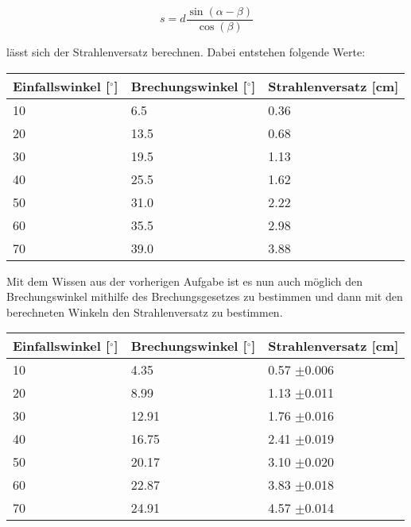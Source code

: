 \begin{displaymath}
    s = d\frac{\sin(\alpha-\beta)}{\cos(\beta)}
\end{displaymath}

\noindent lässt sich der Strahlenversatz berechnen. Dabei entstehen folgende Werte:

\begin{minipage}{\linewidth}
    \begin{table}[H]
        \centering
    \begin{tabular}{lll}
        \toprule
        Einfallswinkel [$^\circ$] & Brechungswinkel [$^\circ$] & Strahlenversatz [cm]  \\
        \midrule
        10 &  6.5 & 0.36 \\
        20 & 13.5 & 0.68 \\
        30 & 19.5 & 1.13 \\
        40 & 25.5 & 1.62 \\ 
        50 & 31.0 & 2.22 \\
        60 & 35.5 & 2.98 \\
        70 & 39.0 & 3.88 \\
        \bottomrule   
    \end{tabular}
    
    \label{tab:3}
\end{table}
\end{minipage}

\noindent Mit dem Wissen aus der vorherigen Aufgabe ist es nun auch möglich den Brechungswinkel mithilfe des Brechungsgesetzes zu bestimmen und dann mit den berechneten Winkeln den Strahlenversatz zu bestimmen.

\begin{minipage}{\linewidth}
    \begin{table}[H]
        \centering
    \begin{tabular}{lll}
        \toprule
        Einfallswinkel [$^\circ$] & Brechungswinkel [$^\circ$] & Strahlenversatz [cm]  \\
        \midrule
        10 &  4.35 & 0.57 $\pm$0.006 \\
        20 & 8.99 & 1.13 $\pm$0.011 \\
        30 & 12.91 & 1.76 $\pm$0.016 \\
        40 & 16.75 & 2.41 $\pm$0.019 \\ 
        50 & 20.17 & 3.10 $\pm$0.020 \\
        60 & 22.87 & 3.83 $\pm$0.018 \\
        70 & 24.91 & 4.57 $\pm$0.014 \\
        \bottomrule   
    \end{tabular}
    
    \label{tab:4}
\end{table}
\end{minipage}

